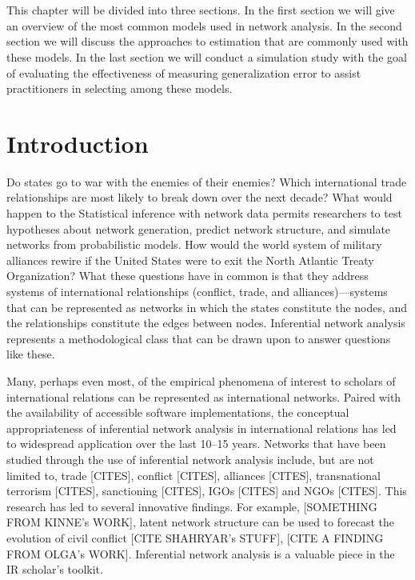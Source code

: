 \documentclass[fleqn,12pt]{wlscirep}
\begin{document}
\\~\\
 This chapter will be divided into three sections. In the first section we will give an overview of the most common models used in network analysis. In the second section we will discuss the approaches to estimation that are commonly used with these models. In the last section we will conduct a simulation study with the goal of evaluating the effectiveness of measuring generalization error to assist practitioners in selecting among these models.

\section{Introduction}

Do states go to war with the enemies of their enemies? Which international trade relationships are most likely to break down over the next decade? What would happen to the  Statistical inference with network data permits researchers to test hypotheses about network generation, predict network structure, and simulate networks from probabilistic models. How would the world system of military alliances rewire if the United States were to exit the North Atlantic Treaty Organization? What these questions have in common is that they  address systems of international relationships (conflict, trade, and alliances)---systems that can be represented as networks in which the states constitute the nodes, and the relationships constitute the edges between nodes. Inferential network analysis represents a methodological class that can be drawn upon to answer questions like these. 

Many, perhaps even most, of the empirical phenomena of interest to scholars of international relations can be represented as international networks. Paired with the availability of accessible software implementations, the conceptual appropriateness of inferential network analysis in international relations has led to widespread application over the last 10--15 years. Networks that have been studied through the use of inferential network analysis include, but are not limited to, trade \citep{ward2007persistent,ward2013gravity,chu2010homogenization} [CITES], conflict \citep{ward2007disputes,hoff2004modeling,cranmer2011inferential,gallop2016endogenous,dorff2013networks} [CITES], alliances \citep{cranmer2012complex} [CITES], transnational terrorism \citep{desmarais2013forecasting,asal2016friends,metternich2013antigovernment} [CITES], sanctioning \citep{cranmer2014reciprocity,dorff2017states}[CITES], IGOs \citep{cao2012global,dorussen2008intergovernmental,lupu2017networked} [CITES] and NGOs \citep{atouba2015international} [CITES]. This research has led to several innovative findings. For example, [SOMETHING FROM KINNE's WORK], latent network structure can be used to forecast the evolution of civil conflict [CITE SHAHRYAR's STUFF], [CITE A FINDING FROM OLGA's WORK]. Inferential network analysis is a valuable piece in the IR scholar's toolkit.
 
\end{document}
